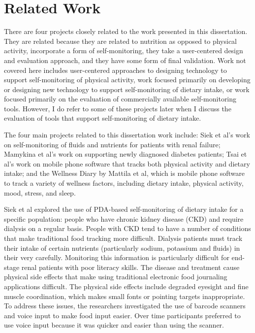 \section{Related Work}
There are four projects closely related to the work presented in this dissertation. They are related because they are related to nutrition as opposed to physical activity, incorporate a form of self-monitoring, they take a user-centered design and evaluation approach, and they have some form of final validation. Work not covered here includes user-centered approaches to designing technology to support self-monitoring of physical activity, work focused primarily on developing or designing new technology to support self-monitoring of dietary intake, or work focused primarily on the evaluation of commercially available self-monitoring tools. However, I do refer to some of these projects later when I discuss the evaluation of tools that support self-monitoring of dietary intake. 

The four main projects related to this dissertation work include: Siek et al's \citep{siek_bridging_2009, siek_design_2006, siek_when_2006} work on self-monitoring of fluids and nutrients for patients with renal failure; Mamykina et al's work on supporting newly diagnosed diabetes patients; Tsai et al's work on mobile phone software that tracks both physical activity and dietary intake; and the Wellness Diary by Mattila et al, which is mobile phone software to track a variety of wellness factors, including dietary intake, physical activity, mood, stress, and sleep. 

Siek et al \citep{siek_bridging_2009, siek_design_2006, siek_when_2006} explored the use of PDA-based self-monitoring of dietary intake for a specific population: people who have chronic kidney disease (CKD) and require dialysis on a regular basis. People with CKD tend to have a number of conditions that make traditional food tracking more difficult. Dialysis patients must track their intake of certain nutrients (particularly sodium, potassium and fluids) in their  very carefully. Monitoring this information is particularly difficult for end-stage renal patients with poor literacy skills. The disease and treatment cause physical side effects that make using traditional electronic food journaling applications difficult. The physical side effects include degraded eyesight and fine muscle coordination, which makes small fonts or pointing targets inappropriate. To address these issues, the researchers investigated the use of barcode scanners and voice input to make food input easier. Over time participants preferred to use voice input because it was quicker and easier than using the scanner. 

